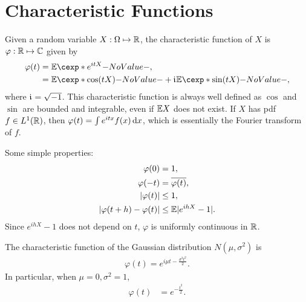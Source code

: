 \documentclass[12pt]{article}
\begin{document}

\section{Characteristic Functions}

Given a random variable $X: \Omega \mapsto \mathbb{R}$, the characteristic function of $X$ is $\varphi : \mathbb{R}\mapsto\mathbb{C}$ given by
\begin{align*}
\varphi(t)&=\E [e^{itX}],\\
&=\E[\cos (tX)]+\iu\E [\sin (tX)],
\end{align*}
where $\mathfrak{i}\mkern1mu=\sqrt{-1}$. This characteristic function is always well defined as $\cos$ and $\sin$ are bounded and integrable, even if $\E X$ does not exist. If $X$ has pdf $f\in L^1(\mathbb{R})$, then $\varphi(t)=\int e^{itx} f(x) \,\mathrm{d} x$, which is essentially the Fourier transform of $f$. 

Some simple properties:
\begin{align*}
\varphi(0)	& =1,\\
\varphi(-t)	& =\overline{\varphi(t)},\\
|\varphi(t)|	& \leq 1,\\
|\varphi(t+h)-\varphi(t)| 	& \leq \E|e^{ihX}-1|.
\end{align*}
Since $e^{ihX}-1$ does not depend on $t$, $\varphi$ is uniformly continuous in $\mathbb{R}$. 

\begin{Example}
The characteristic function of the Gaussian distribution $N(\mu,\sigma^2)$ is
\begin{align*}
\varphi(t)=e^{i\mu t-\frac{\sigma^2t^2}{2}}.
\end{align*}
In particular, when $\mu=0,\sigma^2=1$,
\begin{align*}
\varphi(t)&=e^{-\frac{t^2}{2}}.
\end{align*}
\end{Example}
\end{document}
